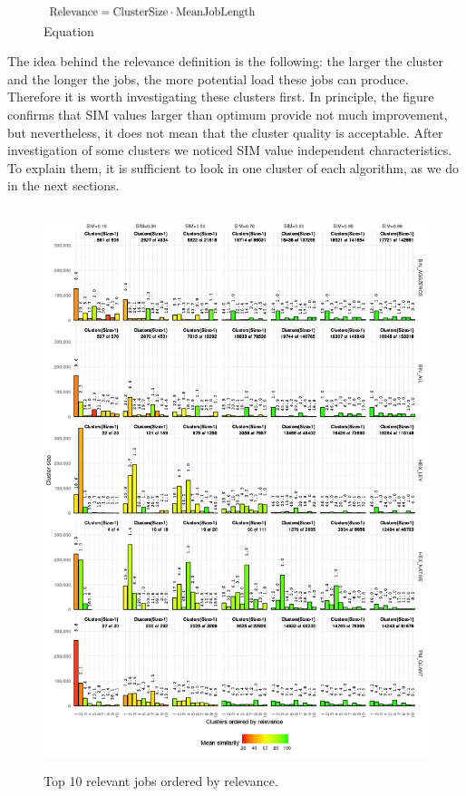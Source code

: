 \documentclass[]{llncs}
\begin{document}
\begin{figure}
  \centering
  \includegraphics[width=2.5in,height=0.12in]{./media/image16.png}
  \caption{Equation}
  \label{fig:equation}
\end{figure}


The idea behind the relevance definition is the following: the larger the cluster and the longer the jobs, the more potential load these jobs can produce.
Therefore it is worth investigating these clusters first.
In principle, the figure confirms that SIM values larger than optimum provide not much improvement, but nevertheless, it does not mean that the cluster quality is acceptable.
After investigation of some clusters we noticed SIM value independent characteristics.
To explain them, it is sufficient to look in one cluster of each algorithm, as we do in the next sections.

\begin{figure}
  \centering
   \includegraphics[width=4.61in,height=6.44in]{./media/image11.png}
   \caption{Top 10 relevant jobs ordered by relevance.}
   \label{fig:top10_relevant_jobs}
\end{figure}
\end{document}
